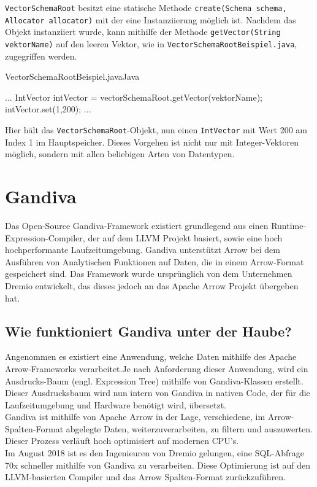 \texttt{VectorSchemaRoot} besitzt eine statische Methode \texttt{create(Schema schema, Allocator allocator)} mit der eine Instanziierung möglich ist.
Nachdem das Objekt instanziiert wurde, kann mithilfe der Methode \texttt{getVector(String vektorName)} auf den leeren Vektor, wie in \texttt{VectorSchemaRootBeispiel.java}, zugegriffen werden.

\begin{codeblock}{VectorSchemaRootBeispiel.java}{Java}
  \begin{javacode}
...
IntVector intVector = vectorSchemaRoot.getVector(vektorName);
intVector.set(1,200);
...
  \end{javacode}
\end{codeblock}


Hier hält das \texttt{VectorSchemaRoot}-Objekt, nun einen \texttt{IntVector} mit Wert 200 am Index 1 im Hauptspeicher.
Dieses Vorgehen ist nicht nur mit Integer-Vektoren möglich, sondern mit allen beliebigen Arten von Datentypen.


\section{Gandiva}
\label{Gandiva}
Das Open-Source Gandiva-Framework existiert grundlegend aus  einen Runtime-Expression-Compiler, der auf dem LLVM Projekt basiert, sowie eine hoch hochperformante Laufzeitumgebung.
Gandiva unterstützt Arrow bei dem Ausführen von Analytischen Funktionen auf Daten, die in einem Arrow-Format gespeichert sind. 
Das Framework wurde ursprünglich von dem Unternehmen Dremio entwickelt, das dieses jedoch an das Apache Arrow Projekt übergeben hat.\cite{Apache:Gandiva}

\subsection{Wie funktioniert Gandiva unter der Haube?}
Angenommen es existiert eine Anwendung, welche Daten mithilfe des  Apache Arrow-Frameworks verarbeitet.Je nach Anforderung dieser Anwendung, wird ein Ausdrucks-Baum (engl. Expression Tree) mithilfe von Gandiva-Klassen erstellt. Dieser Ausdrucksbaum wird nun intern von Gandiva in nativen Code, der für die Laufzeitumgebung und Hardware benötigt wird, übersetzt. \\
Gandiva ist mithilfe von Apache Arrow in der Lage, verschiedene, im Arrow-Spalten-Format abgelegte Daten, weiterzuverarbeiten, zu filtern und auszuwerten.
Dieser Prozess verläuft hoch optimisiert auf modernen CPU's.\cite{Apache:Gandiva} \\
Im August 2018 ist es den Ingenieuren von Dremio gelungen, eine SQL-Abfrage 70x schneller mithilfe von Gandiva zu verarbeiten. Diese Optimierung ist auf den LLVM-basierten Compiler und das Arrow Spalten-Format zurückzuführen.\cite{Apache:Gandiva:Performance}

